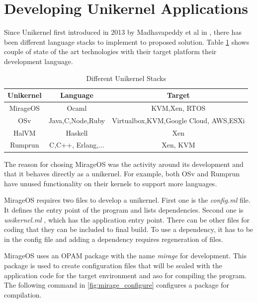 
\section{Developing Unikernel Applications}

Since Unikernel first introduced in 2013 by Madhavapeddy et al in \cite{library-operating-system}, there has been different language stacks to implement to proposed solution. Table \ref{tab:stacks} shows couple of state of the art technologies with their target platform their development language.

\begin{table}[htpb]
    \caption[Different Unikernel Stacks]{Different Unikernel Stacks}\label{tab:stacks}
    \centering
    \begin{tabular}{ |c |c |c| }
      \toprule
        Unikernel & Language & Target \\
      \midrule
        MirageOS & Ocaml & KVM,Xen, RTOS \\
        \hline
        OSv & Java,C,Node,Ruby & Virtualbox,KVM,Google Cloud, AWS,ESXi \\
        \hline
        HalVM & Haskell & Xen \\
      \hline
        Rumprun & C,C++, Erlang,... &  Xen, KVM \\
      \bottomrule
    \end{tabular}
  \end{table}

The reason for chosing MirageOS was the activity around its development and that it behaves directly as a unikernel. For example, both OSv and Rumprun have unused functionality on their kernels to support more languages.

MirageOS requires two files to develop a unikernel. First one is the \textit{config.ml} file. It defines the entry point of the program and lists dependencies. Second one is \textit{unikernel.ml} , which has the application entry point. There can be other files for coding that they can be included to final build. To use a dependency, it has to be in the config file and adding a dependency requires regeneration of files.

MirageOS uses an OPAM package with the name \textit{mirage} \cite{opammirage} for development. This package is used to create configuration files that will be sealed with the application code for the target environment and aso for compiling the program. The following command in \ref{fig:mirage_configure} configures a package for compilation. 

